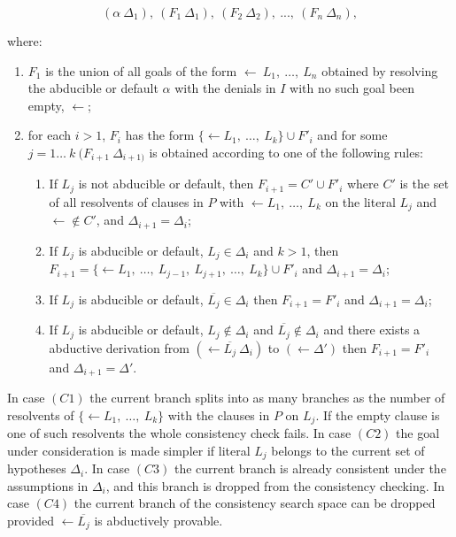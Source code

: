 \begin{equation}
    (\alpha\ \Delta_1),\ (F_1\ \Delta_1),\  (F_2\ \Delta_2),\ ..., \ (F_n\ \Delta_n),  
\end{equation}

where:

\begin{enumerate}[label=(\arabic*)]
    \item $F_1$ is the union of all goals of the form  $\leftarrow\ L_1,\ \dots,\ L_n$ obtained by resolving the abducible or default $\alpha$ with the denials in $I$ with no such goal been
    empty, $\leftarrow$;
    \item for each $i > 1$, $F_i$ has the form $\{ \leftarrow L_1,\ \dots,\ L_k\} \cup F'_i$ and for some $j = 1\dots\ k\ (F_{i+1}\ \Delta_{i+1)}$ is obtained according to one of the following rules:
    \begin{enumerate}[label=(C\arabic*)]
        \item  If $L_j$ is not abducible or default, then $F_{i+1} = C' \cup F'_i$ where $C'$ is the set of all resolvents of clauses in $P$ with $\leftarrow L_1,\ \dots,\ L_k$ on the literal $L_j$ and $\leftarrow \notin C'$, and $\Delta_{i+1} = \Delta_i$;
        \item If $L_j$ is abducible or default, $L_j \in \Delta_i$ and $k > 1$, then \\
        $F_{i+1} = \{ \leftarrow L_1,\ \dots,\ L_{j-1},\ L_{j+1},\ \dots,\ L_k \} \cup F'_i $ and $\Delta_{i+1} = \Delta_i$;
        \item If $L_j$ is abducible or default, $\overline{L_j} \in \Delta_i$ then $F_{i+1} = F'_i$ and $\Delta_{i+1} = \Delta_i$;
        \item If $L_j$ is abducible or default, $L_j \notin \Delta_i$ and $\overline{L_j} \notin \Delta_i$ and there exists a abductive derivation from $(\leftarrow \overline{L_j}\ \Delta_i)$ to $(\leftarrow \Delta')$ then
        $F_{i+1} = F'_i$ and $\Delta_{i+1} = \Delta'$.
    \end{enumerate}
\end{enumerate}

In case $(C1)$ the current branch splits into as many branches as the number of resolvents of  $\{ \leftarrow L_1,\ \dots,\ L_k\}$ with the clauses in $P$ on $L_j$. If the empty clause is one of such resolvents the whole consistency check fails.
In case $(C2)$ the goal under consideration is made simpler if literal $L_j$ belongs to the current set of hypotheses $\Delta_i$. 
In case $(C3)$ the current branch is already consistent under the assumptions in $\Delta_i$, and this branch is dropped from the consistency checking.
In case $(C4)$ the current branch of the consistency search space can be dropped provided $\leftarrow \overline{L_j}$ is abductively provable.

